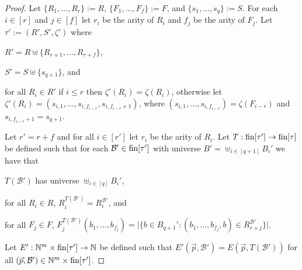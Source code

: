\documentclass[../main/thesis.tex]{subfiles}
\begin{document}
\begin{proof}
  Let $\{R_1, \ldots, R_{r}\} := R$, $\{ F_1, \ldots, F_{f} \} := F$, and
  $\{s_1, \ldots, s_{q}\} := S$. For each $i \in [r]$ and $j \in [f]$ let $r_i$
  be the arity of $R_i$ and $f_j$ be the arity of $F_j$. Let $\tau' := (R', S',
  \zeta')$ where
  \begin{myitemize}
  \item $R' = R \uplus \{R_{r + 1}, \ldots, R_{r + f}\}$,
  \item $S' = S \uplus \{s_{q+1}\}$, and
  \item for all $R_i \in R'$ if $i \leq r$ then $\zeta' (R_i) = \zeta(R_i)$,
    otherwise let $\zeta'(R_{i}) = (s_{i, 1}, \ldots, s_{i, f_{i - r}}, s_{i,
      f_{i - r} + 1})$, where $(s_{i, 1}, \ldots, s_{i, f_{i -r}}) = \zeta(F_{i
      - r})$ and $s_{i, f_{i - r}+1} = s_{q+1}$.
  \end{myitemize}
  Let $r' = r + f$ and for all $i \in [r']$ let $r_i$ be the arity of $R_i$. Let
  $T : \text{\upshape fin}[\tau'] \rightarrow \text{\upshape fin}[\tau]$ be defined such that for each $\mathcal{B}'
  \in \text{\upshape fin}[\tau']$ with universe $B' = \uplus_{i \in [q + 1]}B_i'$ we have that
  \begin{myitemize}
  \item $T(\mathcal{B}')$ has universe $\uplus_{i \in [q]}B_i'$,
  \item for all $R_i \in R$, $R^{T(\mathcal{B}')}_i = R^{\mathcal{B}'}_i$, and
  \item for all $F_j \in F$, $F^{T(\mathcal{B}')}_j(b_1, \ldots, b_{f_j}) =
    \vert \{ b \in B_{q+1}': (b_1, \ldots, b_{f_j}, b) \in R^{\mathcal{B}'}_{r +
      j}\} \vert$.
  \end{myitemize}
  Let $E': \mathbb{N}^m \times \text{\upshape fin}[\tau'] \rightarrow \mathbb{N}$ be defined such that
  $E'(\vec{p}, \mathcal{B}') = E(\vec{p}, T(\mathcal{B}'))$ for all $(\vec{p},
  \mathcal{B}') \in \mathbb{N}^m \times \text{\upshape fin}[\tau']$.



\end{proof}
\end{document}
